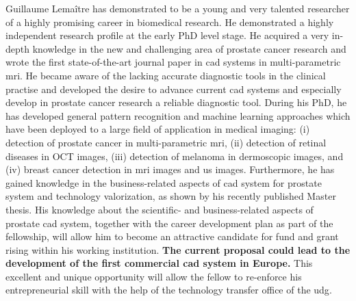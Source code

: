 Guillaume Lema\^itre has demonstrated to be a young and very talented researcher of a highly promising career in biomedical research. He demonstrated a highly independent research profile at the early PhD level stage. 
He acquired a very in-depth knowledge in the new and challenging area of prostate cancer research and wrote the first state-of-the-art journal paper in \ac{cad} systems in multi-parametric \ac{mri}.
He became aware of the lacking accurate diagnostic tools in the clinical practise and developed the desire to advance current \ac{cad} systems and especially develop in prostate cancer research a reliable diagnostic tool. 
During his PhD, he has developed general pattern recognition and machine learning approaches which have been deployed to a large field of application in medical imaging: (i) detection of prostate cancer in multi-parametric \ac{mri}, (ii) detection of retinal diseases in OCT images, (iii) detection of melanoma in dermoscopic images, and (iv) breast cancer detection in \ac{mri} images and \ac{us} images. 
Furthermore, he has gained knowledge in the business-related aspects of \ac{cad} system for prostate system and technology valorization, as shown by his recently published Master thesis.
His knowledge about the scientific- and business-related aspects of prostate \ac{cad} system, together with the career development plan as part of the fellowship, will allow him to become an attractive candidate for fund and grant rising within his working institution.
\textbf{The current proposal could lead to the development of the first commercial \ac{cad} system in Europe.}
This excellent and unique opportunity will allow the fellow to re-enforce his entrepreneurial skill with the help of the technology transfer office of the \ac{udg}. 